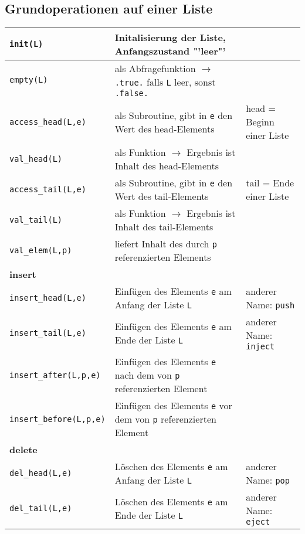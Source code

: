 \subsection{Grundoperationen auf einer Liste}

\begin{longtable}{p{}|p{}|p{}}
	\texttt{init(L)} & Initalisierung der Liste, Anfangszustand "'leer"' & \\
	\hline
	\texttt{empty(L)} & als Abfragefunktion $\to$ \texttt{.true.} falls \texttt{L} leer, sonst \texttt{.false.} & \\
	\hline
	\texttt{access\_head(L,e)} & als Subroutine, gibt in \texttt{e} den Wert des head-Elements & head = Beginn einer Liste \\
	\hline
	\texttt{val\_head(L)} & als Funktion $\to$ Ergebnis ist Inhalt des head-Elements & \\
	\hline
	\texttt{access\_tail(L,e)} & als Subroutine, gibt in \texttt{e} den Wert des tail-Elements & tail = Ende einer Liste \\
	\hline
	\texttt{val\_tail(L)} & als Funktion $\to$ Ergebnis ist Inhalt des tail-Elements & \\
	\hline
	\texttt{val\_elem(L,p)} & liefert Inhalt des durch \texttt{p} referenzierten Elements & \\
	\hline
	\multicolumn{3}{p{\textwidth}}{\cellcolor{lightgray}\textbf{insert}} \\
	\hline
	\texttt{insert\_head(L,e)} & Einfügen des Elements \texttt{e} am Anfang der Liste \texttt{L} & anderer Name: \texttt{push} \\
	\hline
	\texttt{insert\_tail(L,e)} & Einfügen des Elements \texttt{e} am Ende der Liste \texttt{L} & anderer Name: \texttt{inject} \\
	\hline
	\texttt{insert\_after(L,p,e)} & Einfügen des Elements \texttt{e} nach dem von \texttt{p} referenzierten Element & \\
	\hline
	\texttt{insert\_before(L,p,e)} & Einfügen des Elements \texttt{e} vor dem von \texttt{p} referenzierten Element & \\
	\hline
	\multicolumn{3}{p{\textwidth}}{\cellcolor{lightgray}\textbf{delete}} \\
	\hline
	\texttt{del\_head(L,e)} & Löschen des Elements \texttt{e} am Anfang der Liste \texttt{L} & anderer Name: \texttt{pop} \\
	\hline
	\texttt{del\_tail(L,e)} & Löschen des Elements \texttt{e} am Ende der Liste \texttt{L} & anderer Name: \texttt{eject} \\

\end{longtable}

